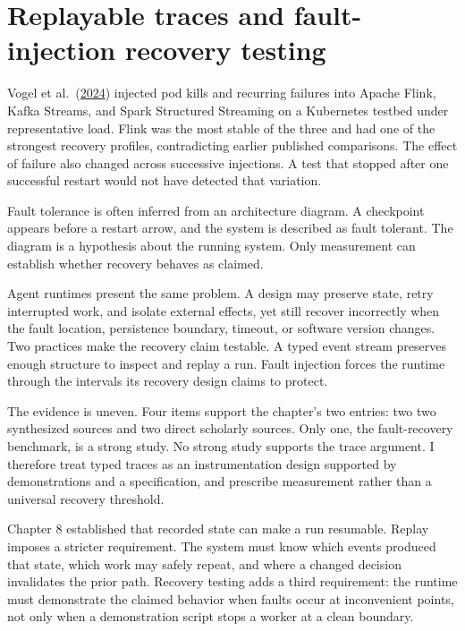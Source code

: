 \chapter{Replayable traces and fault-injection recovery testing}
\label{ch09-replayable-traces-fault-injection-recovery}
Vogel et al.~(\href{https://arxiv.org/abs/2404.06203}{2024}) injected pod kills and recurring failures into Apache Flink, Kafka Streams, and Spark Structured Streaming on a Kubernetes testbed under representative load. Flink was the most stable of the three and had one of the strongest recovery profiles, contradicting earlier published comparisons. The effect of failure also changed across successive injections. A test that stopped after one successful restart would not have detected that variation.

Fault tolerance is often inferred from an architecture diagram. A checkpoint appears before a restart arrow, and the system is described as fault tolerant. The diagram is a hypothesis about the running system. Only measurement can establish whether recovery behaves as claimed.

Agent runtimes present the same problem. A design may preserve state, retry interrupted work, and isolate external effects, yet still recover incorrectly when the fault location, persistence boundary, timeout, or software version changes. Two practices make the recovery claim testable. A typed event stream preserves enough structure to inspect and replay a run. Fault injection forces the runtime through the intervals its recovery design claims to protect.

The evidence is uneven. Four items support the chapter's two entries: two two synthesized sources and two direct scholarly sources. Only one, the fault-recovery benchmark, is a strong study. No strong study supports the trace argument. I therefore treat typed traces as an instrumentation design supported by demonstrations and a specification, and prescribe measurement rather than a universal recovery threshold.

Chapter 8 established that recorded state can make a run resumable. Replay imposes a stricter requirement. The system must know which events produced that state, which work may safely repeat, and where a changed decision invalidates the prior path. Recovery testing adds a third requirement: the runtime must demonstrate the claimed behavior when faults occur at inconvenient points, not only when a demonstration script stops a worker at a clean boundary.

